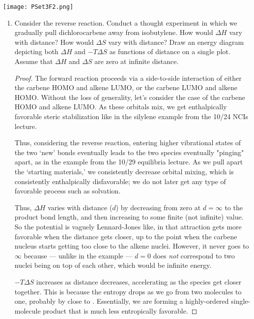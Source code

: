 \documentclass[../psets.tex]{subfiles}
\begin{document}
\begin{enumerate}
    \begin{center}
        \texttt{[image: PSet3F2.png]}
    \end{center}
    \begin{enumerate}
        \item Consider the reverse reaction. Conduct a thought experiment in which we gradually pull dichlorocarbene away from isobutylene. How would $\Delta H$ vary with distance? How would $\Delta S$ vary with distance? Draw an energy diagram depicting both $\Delta H$ and $-T\Delta S$ as functions of distance on a single plot. Assume that $\Delta H$ and $\Delta S$ are zero at infinite distance.
        \begin{proof}
            The forward reaction proceeds via a side-to-side interaction of either the carbene HOMO and alkene LUMO, or the carbene LUMO and alkene HOMO. Without the loss of generality, let's consider the case of the carbene HOMO and alkene LUMO. As these orbitals mix, we get enthalpically favorable steric stabilization like in the silylene example from the 10/24  NCIs lecture.\par
            Thus, considering the reverse reaction, entering higher vibrational states of the two `new'  bonds eventually leads to the two species eventually "pinging" apart, as in the  example from the 10/29 equilibria lecture. As we pull apart the `starting materials,' we consistently decrease orbital mixing, which is consistently enthalpically disfavorable; we do not later get any type of favorable process such as solvation.\par
            Thus, $\Delta H$ varies with distance ($d$) by decreasing from zero at $d=\infty$ to the product bond length, and then increasing to some finite (not infinite) value. So the potential is vaguely Lennard-Jones like, in that attraction gets more favorable when the distance gets closer, up to the point when the carbene nucleus starts getting too close to the alkene nuclei. However, it never goes to $\infty$ because --- unlike in the  example --- $d=0$ does \emph{not} correspond to two nuclei being on top of each other, which would be infinite energy.\par
            $-T\Delta S$ increases as distance decreases, accelerating as the species get closer together. This is because the entropy drops as we go from two molecules to one, probably by close to . Essentially, we are forming a highly-ordered single-molecule product that is much less entropically favorable.

\end{proof}
\end{enumerate}
\end{enumerate}
\end{document}
